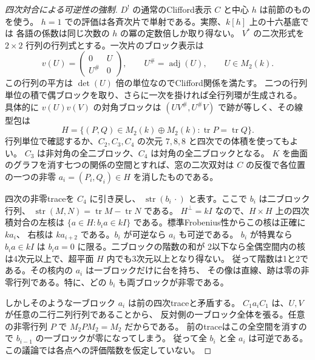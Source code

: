 \begin{proof}[四次対合による可逆性の強制]
$D^!$ の通常のClifford表示 $C$ と中心 $h$ は前節のものを使う。
$h=1$ での評価は各斉次片で単射である。実際、$k[h]$ 上の十六基底では
各語の係数は同じ次数の $h$ の冪の定数倍しか取り得ない。
$V^*$ の二次形式を $2\times2$ 行列の行列式とする。一次片のブロック表示は
\[
 v(U)=\begin{pmatrix}0&U\\ U^\#&0\end{pmatrix},\qquad
 U^\#=\operatorname{adj}(U),\qquad U\in M_2(k).
\]
この行列の平方は $\det(U)$ 倍の単位なのでClifford関係を満たす。
二つの行列単位の積で偶ブロックを取り、さらに一次を掛ければ全行列環が生成される。
具体的に $v(U)v(V)$ の対角ブロックは $(UV^\#,U^\#V)$ で跡が等しく、その線型包は
\[
 H=\{(P,Q)\in M_2(k)\oplus M_2(k):\operatorname{tr}P=\operatorname{tr}Q\}.
\]
行列単位で確認するか、$C_2,C_3,C_4$ の次元 $7,8,8$ と四次での体積を使ってもよい。
$C_3$ は非対角の全二ブロック、$C_4$ は対角の全二ブロックとなる。
$K$ を曲面のグラフを消す七つの関係の空間とすれば、窓の二次双対は
$C$ の反復で各位置の一つの非零 $a_i=(P_i,Q_i)\in H$ を消したものである。

四次の非零traceを $C_4$ に引き戻し、
$\operatorname{str}(b_i\,\cdot)$ と表す。ここで $b_i$ は二ブロック行列、
$\operatorname{str}(M,N)=\operatorname{tr}M-\operatorname{tr}N$ である。
$H^\perp=kI$ なので、$H\times H$ 上の四次積対合の左核は
$\{a\in H:b_i a\in kI\}$ である。標準Frobenius性からこの核は正確に $ka_i$、
右核は $ka_{i+2}$ である。$b_i$ が可逆なら $a_i$ も可逆である。
$b_i$ が特異なら $b_i a\in kI$ は $b_i a=0$ に限る。二ブロックの階数の和が
2以下なら全偶空間内の核は4次元以上で、超平面 $H$ 内でも3次元以上となり得ない。
従って階数は1と2である。その核内の $a_i$ は一ブロックだけに台を持ち、
その像は直線、跡は零の非零行列である。特に、どの $b_i$ も両ブロックが非零である。

しかしそのような一ブロック $a_i$ は前の四次traceと矛盾する。
$C_1a_i C_1$ は、$U,V$ が任意の二行二列行列であることから、
反対側の一ブロック全体を張る。任意の非零行列 $P$ で $M_2 P M_2=M_2$ だからである。
前のtraceはこの全空間を消すので $b_{i-1}$ の一ブロックが零になってしまう。
従って全 $b_i$ と全 $a_i$ は可逆である。この議論では各点への評価階数を仮定していない。
\end{proof}

